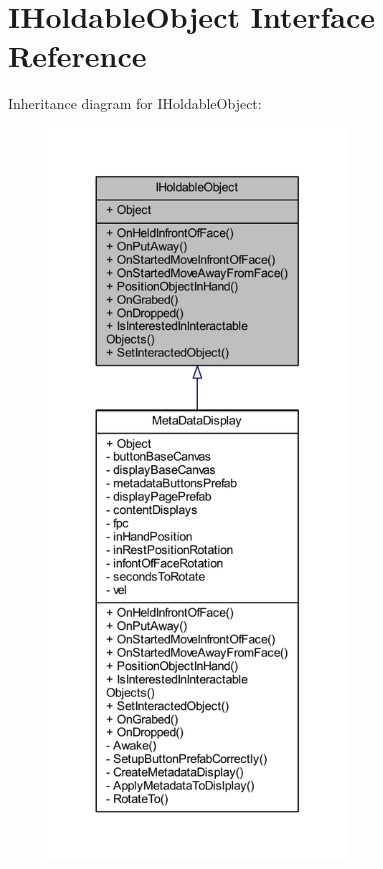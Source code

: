 \hypertarget{interface_i_holdable_object}{}\section{I\+Holdable\+Object Interface Reference}
\label{interface_i_holdable_object}


Inheritance diagram for I\+Holdable\+Object\+:\nopagebreak
\begin{figure}[H]
\begin{center}
\leavevmode
\includegraphics[height=550pt]{interface_i_holdable_object__inherit__graph}
\end{center}
\end{figure}



